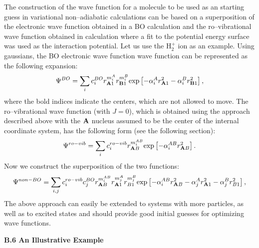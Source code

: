 The construction of the wave function for a molecule 
to be used as an
starting guess in variational non--adiabatic calculations
can be based on a superposition of the electronic wave function
obtained in a BO calculation and the ro--vibrational wave function
obtained in calculation where a fit to the potential energy
surface was used as the interaction potential. Let us use the H$_2^+$
ion as an example. Using gaussians, the BO electronic wave function 
wave function can be represented as the following expansion:
\begin{equation}
\Psi^{BO} = 
\sum_i c_i^{BO} r_{ {\bf A}1}^{m_i^A} r_{ {\bf B}1}^{m_i^B}
{\rm exp} \left[ -\alpha_i^A r_{ {\bf A}1}^2 
- \alpha_i^B r_{ {\bf B}1}^2 \right],
\label{BO1}
\end{equation}
where the bold indices indicate the centers, which are not allowed to move.
The ro--vibrational wave function (with $J=0$), which is obtained using the
approach described above with the ${\bf A}$ nucleus assumed to be
the center of the internal coordinate system, has the following form
(see the following section):
\begin{equation}
\Psi^{ro-vib} = 
\sum_i c_i^{ro-vib} r_{ {\bf A}B}^{m_i^{AB}} 
{\rm exp} \left[ -\alpha_i^{AB} r_{ {\bf A}B}^2 \right].
\label{BO2}
\end{equation}
Now we construct the superposition of the two functions:
\begin{equation}
\Psi^{non-BO} = 
\sum_{i,j} c_i^{ro-vib} c_j^{BO} 
r_{ {\bf A}B}^{m_i^{AB}}
r_{ {\bf A}1}^{m_j^A} r_{B1}^{m_j^B}
{\rm exp} 
\left[ -\alpha_i^{AB} r_{ {\bf A}B}^2 -\alpha_j^A r_{ {\bf A}1}^2 
- \alpha_j^B r_{B1}^2 \right],
\label{BO3}
\end{equation}
The above approach can easily be extended to systems with more particles,
as well as to excited states
and should provide good initial guesses for optimizing wave functions.



\vspace{2mm}
\noindent
{\bf B.6 An Illustrative Example}

